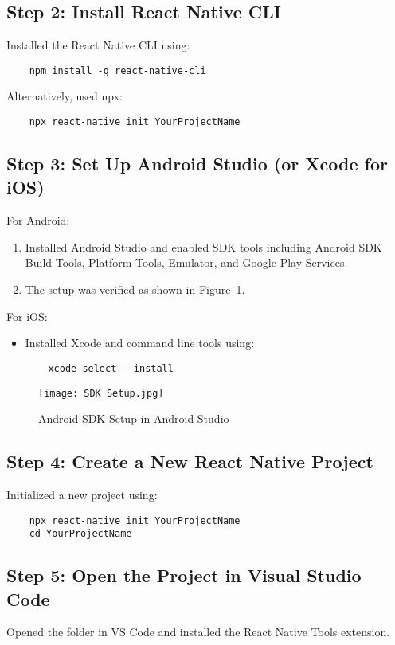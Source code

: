 \documentclass{article}
\begin{document}
\subsection{Step 2: Install React Native CLI}
Installed the React Native CLI using:
\begin{verbatim}
    npm install -g react-native-cli
\end{verbatim}
Alternatively, used npx:
\begin{verbatim}
    npx react-native init YourProjectName
\end{verbatim}

\subsection{Step 3: Set Up Android Studio (or Xcode for iOS)}
For Android:
\begin{enumerate}
    \item Installed Android Studio and enabled SDK tools including Android SDK Build-Tools, Platform-Tools, Emulator, and Google Play Services.
    \item The setup was verified as shown in Figure~\ref{fig:sdk_setup}.
\end{enumerate}
For iOS:
\begin{itemize}
    \item Installed Xcode and command line tools using:
    \begin{verbatim}
    xcode-select --install
    \end{verbatim}
\end{itemize}

\begin{figure}[H]
    \centering
    \texttt{[image: SDK Setup.jpg]}
    \caption{Android SDK Setup in Android Studio}
    \label{fig:sdk_setup}
\end{figure}

\subsection{Step 4: Create a New React Native Project}
Initialized a new project using:
\begin{verbatim}
    npx react-native init YourProjectName
    cd YourProjectName
\end{verbatim}

\subsection{Step 5: Open the Project in Visual Studio Code}
Opened the folder in VS Code and installed the React Native Tools extension.
\end{document}
